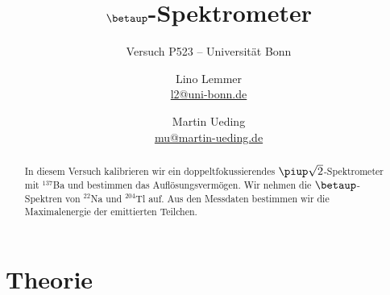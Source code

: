 

\usepackage[section]{placeins}

\usepackage{csquotes}

\usepackage{tikz}
\usetikzlibrary{chains}
\usetikzlibrary{shapes.geometric}


\usepackage{pgfplots}

\tikzexternalize


\usepackage{booktabs}

\hypersetup{
    pdftitle=
}

\subject{Praktikumsprotokoll}
\title{$\boldsymbol\betaup$-Spektrometer}
\subtitle{Versuch P523 -- Universität Bonn}
\author{
    Lino Lemmer \\ \small{\href{mailto:l2@uni-bonn.de}{l2@uni-bonn.de}}
    \and
    Martin Ueding \\ \small{\href{mailto:mu@martin-ueding.de}{mu@martin-ueding.de}}
}

\date{}

\publishers{Tutor: Farah Noreen Afzal}



\maketitle


\begin{abstract}
    In diesem Versuch kalibrieren wir ein doppeltfokussierendes $\piup
    \sqrt2$-Spektrometer mit $^{137}$Ba und bestimmen das Auflösungsvermögen.
    Wir nehmen die $\betaup$-Spektren von $^{22}$Na und $^{204}$Tl auf. Aus den
    Messdaten bestimmen wir die Maximalenergie der emittierten Teilchen.
\end{abstract}

\tableofcontents

\chapter{Theorie}

